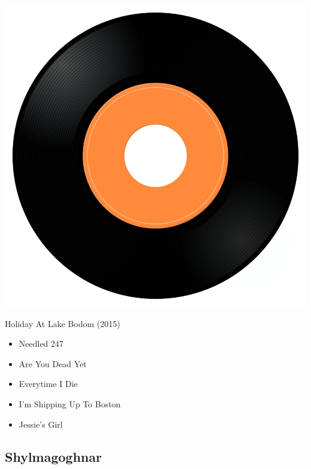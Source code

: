 \begin{minipage}[t]{0.25\textwidth}\vspace{0pt}
\captionsetup{type=figure}
\includegraphics[width=\textwidth]{Images/cover.png}
\caption*{Holiday At Lake Bodom (2015)}
\end{minipage}
\begin{minipage}[t]{0.25\textwidth}\vspace{0pt}
\begin{itemize}[nosep,leftmargin=1em,labelwidth=*,align=left]
	\setlength{\itemsep}{0pt}
	\item Needled 24\/7
	\item Are You Dead Yet
	\item Everytime I Die
	\item I'm Shipping Up To Boston
	\item Jessie's Girl
\end{itemize}
\end{minipage}

\subsection{Shylmagoghnar}

